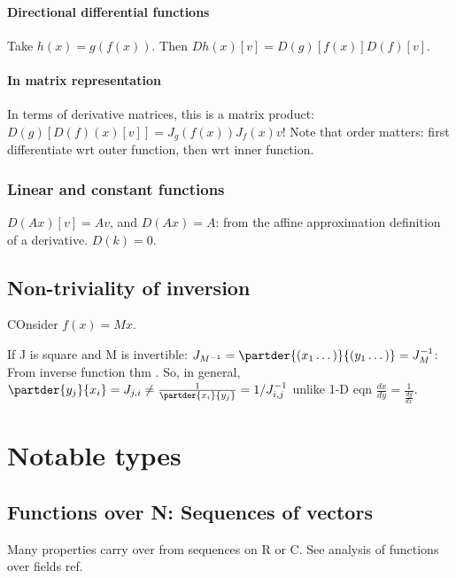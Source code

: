 \documentclass[oneside, article]{memoir}
\begin{document}
\subsubsection{Directional differential functions}
Take $h(x) = g(f(x))$. Then $Dh(x)[v] = D(g)[f(x)]D(f)[v]$.


\subsubsection{In matrix representation}
In terms of derivative matrices, this is a matrix product: $D(g)[D(f)(x)[v]] = J_g(f(x)) J_f(x) v$! Note that order matters: first differentiate wrt outer function, then wrt inner function.


\subsection{Linear and constant functions}
$D(Ax)[v] = Av$, and $D(Ax) = A$: from the affine approximation definition of a derivative. $D(k) = 0$.

\section{Non-triviality of inversion}
COnsider $f(x) = Mx$.

If J is square and M is invertible: $J_{M^{-1}} = \partder{(x_{1} \dots)}{(y_{1} \dots)} = J_{M}^{-1}$: From inverse function thm \why. So, in general, $\partder{y_{j}}{x_{i}} = J_{j, i} \neq \frac{1}{\partder{x_{i}}{y_{j}}} = 1/J^{-1}_{i, j}$ unlike 1-D eqn $\frac{dx}{dy} = \frac{1}{\frac{dy}{dx}}$.

\chapter{Notable types}
\section{Functions over N: Sequences of vectors}
Many properties carry over from sequences on R or C. See analysis of functions over fields ref.
\end{document}
